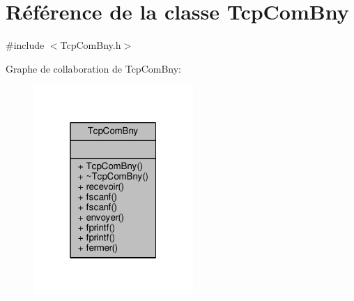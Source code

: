 \hypertarget{classTcpComBny}{}\section{Référence de la classe Tcp\+Com\+Bny}
\label{classTcpComBny}


{\ttfamily \#include $<$Tcp\+Com\+Bny.\+h$>$}



Graphe de collaboration de Tcp\+Com\+Bny\+:\nopagebreak
\begin{figure}[H]
\begin{center}
\leavevmode
\includegraphics[width=172pt]{classTcpComBny__coll__graph}
\end{center}
\end{figure}
